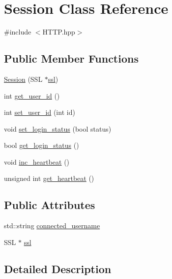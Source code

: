 \hypertarget{class_session}{}\section{Session Class Reference}
\label{class_session}


{\ttfamily \#include $<$H\+T\+T\+P.\+hpp$>$}

\subsection*{Public Member Functions}
\begin{DoxyCompactItemize}
\item 
\hyperlink{class_session_a2fdcb68a082443ed916d0a4821443e45}{Session} (S\+SL $\ast$\hyperlink{class_session_aa10aed26ea7c02319c118af55076295e}{ssl})
\item 
int \hyperlink{class_session_a27ff9bf22983a7f3a11404afc8ca75b0}{get\+\_\+user\+\_\+id} ()
\item 
int \hyperlink{class_session_a53ebfd01b312282657f5072ee4b354ce}{set\+\_\+user\+\_\+id} (int id)
\item 
void \hyperlink{class_session_a489d5cc0b4c6a91818b4292253f5c379}{set\+\_\+login\+\_\+status} (bool status)
\item 
bool \hyperlink{class_session_a8f6a35778f3f4a79ccd1cc4c681e33f0}{get\+\_\+login\+\_\+status} ()
\item 
void \hyperlink{class_session_ac17618c5aa9d130bf6d44013b4796577}{inc\+\_\+heartbeat} ()
\item 
unsigned int \hyperlink{class_session_a17b56b5b64e8952207b5d3cd3f6ea715}{get\+\_\+heartbeat} ()
\end{DoxyCompactItemize}
\subsection*{Public Attributes}
\begin{DoxyCompactItemize}
\item 
std\+::string \hyperlink{class_session_a2a2b3e2d7b9a83aed8ec95a1cf780ce0}{connected\+\_\+username}
\item 
S\+SL $\ast$ \hyperlink{class_session_aa10aed26ea7c02319c118af55076295e}{ssl}
\end{DoxyCompactItemize}


\subsection{Detailed Description}


